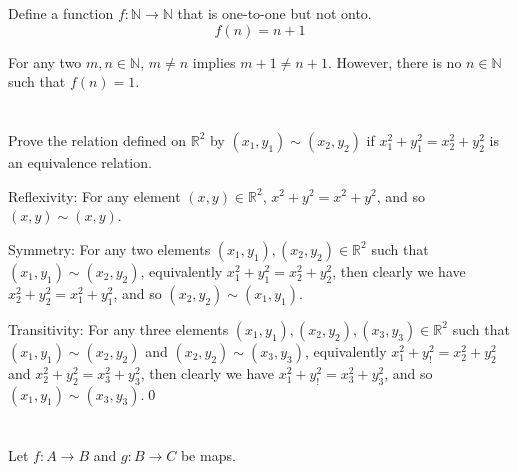 Define a function $f: \mathbb{N} \rightarrow \mathbb{N}$ that is one-to-one but not onto.
\hr
\[f(n) = n + 1\]

For any two $m, n \in \mathbb{N}$, $m \neq n$ implies $m + 1 \neq n + 1$. However, there is no $n \in \mathbb{N}$ such that $f(n) = 1$.

\section{}\label{sec:1-21}

Prove the relation defined on $\mathbb{R}^2$ by $(x_1, y_1) \sim (x_2, y_2)$ if $x_1^2 + y_1^2 = x_2^2 + y_2^2$ is an equivalence relation.
\hr

Reflexivity: For any element $(x,y) \in \mathbb{R}^2$, $x^2 + y^2 = x^2 + y^2$, and so $(x, y) \sim (x, y)$.

\smallskip

Symmetry: For any two elements $(x_1, y_1), (x_2, y_2) \in \mathbb{R}^2$ such that $(x_1, y_1) \sim (x_2, y_2)$, equivalently
$x_1^2 + y_1^2 = x_2^2 + y_2^2$, then clearly we have $x_2^2 + y_2^2 = x_1^2 + y_1^2$, and so $(x_2, y_2) \sim (x_1, y_1)$.

\smallskip

Transitivity: For any three elements $(x_1, y_1), (x_2, y_2), (x_3, y_3) \in \mathbb{R}^2$ such that \\$(x_1, y_1) \sim (x_2, y_2)$ and $(x_2, y_2) \sim (x_3, y_3)$, equivalently $x_1^2 + y_!^2 = x_2^2 + y_2^2$ and $x_2^2 + y_2^2 = x_3^2 + y_3^2$, then clearly we have $x_1^2 + y_!^2 = x_3^2 + y_3^2$, and so $(x_1, y_1) \sim (x_3, y_3)$.\qed

\section{}\label{sec:1-22}

Let $f:A \rightarrow B$ and $g:B \rightarrow C$ be maps.

